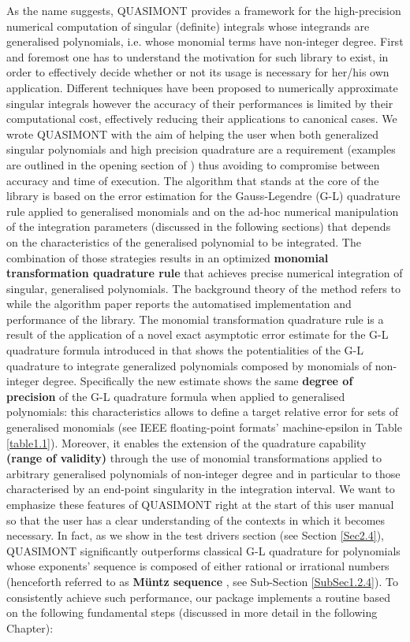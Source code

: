 \documentclass[a4paper, twosided]{book}
\begin{document}
\noindent
As the name suggests, QUASIMONT provides a framework for the high-precision numerical computation of singular (definite) integrals whose integrands are generalised polynomials, i.e. whose monomial terms have non-integer degree. First and foremost one has to understand the motivation for such library to exist, in order to effectively decide whether or not its usage is necessary for her/his own application. Different techniques have been proposed to numerically approximate singular integrals however the accuracy of their performances is limited by their computational cost, effectively reducing their applications to canonical cases. We wrote QUASIMONT with the aim of helping the user when both generalized singular polynomials and high precision quadrature are a requirement (examples are outlined in the opening section of \cite{Lombardi21}) thus avoiding to compromise between accuracy and time of execution. The algorithm that stands at the core of the library is based on the error estimation for the Gauss-Legendre (G-L) quadrature rule applied to generalised monomials and on the ad-hoc numerical manipulation of the integration parameters (discussed in the following sections) that depends on the characteristics of the generalised polynomial to be integrated. The combination of those strategies results in an optimized \color{poliDarkBlue} \textbf{monomial transformation quadrature rule} \color{black} that achieves precise numerical integration of singular, generalised polynomials. The background theory of the method refers to \cite{Lombardi09} while the algorithm paper \cite{Lombardi21} reports the automatised implementation and performance of the library. The monomial transformation quadrature rule is a result of the application of a novel exact asymptotic error estimate for the G-L quadrature formula introduced in \cite{Lombardi09} that shows the potentialities of the G-L quadrature to integrate generalized polynomials composed by monomials of non-integer degree. Specifically the new estimate shows the same \color{poliDarkBlue} \textbf{degree of precision} \color{black} of the G-L quadrature formula when applied to generalised polynomials: this characteristics allows to define a  target relative error for sets of generalised monomials (see IEEE floating-point formats' machine-epsilon in Table \ref{table1.1}). Moreover, it enables the extension of the quadrature capability  \color{poliDarkBlue} \textbf{(range of validity)} \color{black} through the use of monomial transformations applied to arbitrary generalised polynomials of non-integer degree and in particular to those characterised by an end-point singularity in the integration interval. We want to emphasize these features of QUASIMONT right at the start of this user manual so that the user has a clear understanding of the contexts in which it becomes necessary. In fact, as we show in the test drivers section (see Section \ref{Sec2.4}), QUASIMONT significantly outperforms classical G-L quadrature for polynomials whose exponents' sequence is composed of either rational or irrational numbers (henceforth referred to as \color{poliDarkBlue} \textbf{Müntz sequence} \color{black}, see Sub-Section \ref{SubSec1.2.4}). To consistently achieve such performance, our package implements a routine based on the following fundamental steps (discussed in more detail in the following Chapter):
\end{document}
